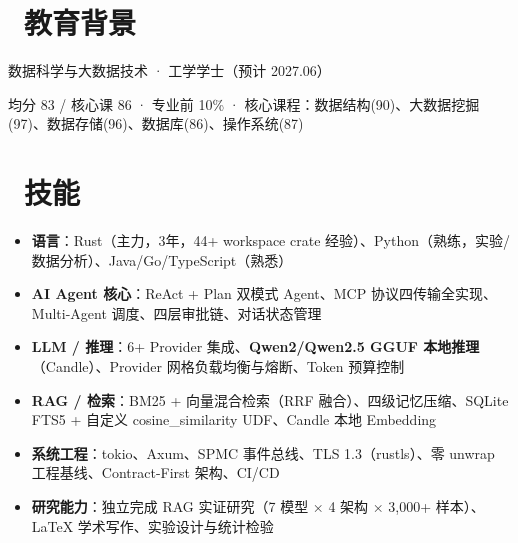 \documentclass{resume}
\begin{document}



\section{\faGraduationCap\ 教育背景}
数据科学与大数据技术 · 工学学士（预计 2027.06）

均分 83 / 核心课 86 · 专业前 10\% · 核心课程：数据结构(90)、大数据挖掘(97)、数据存储(96)、数据库(86)、操作系统(87)

\section{\faCogs\ 技能}
\begin{itemize}[parsep=0.5ex]
  \item \textbf{语言}：Rust（主力，3年，44+ workspace crate 经验）、Python（熟练，实验/数据分析）、Java/Go/TypeScript（熟悉）
  \item \textbf{AI Agent 核心}：ReAct + Plan 双模式 Agent、MCP 协议四传输全实现、Multi-Agent 调度、四层审批链、对话状态管理
  \item \textbf{LLM / 推理}：6+ Provider 集成、\textbf{Qwen2/Qwen2.5 GGUF 本地推理}（Candle）、Provider 网格负载均衡与熔断、Token 预算控制
  \item \textbf{RAG / 检索}：BM25 + 向量混合检索（RRF 融合）、四级记忆压缩、SQLite FTS5 + 自定义 cosine\_similarity UDF、Candle 本地 Embedding
  \item \textbf{系统工程}：tokio、Axum、SPMC 事件总线、TLS 1.3（rustls）、零 unwrap 工程基线、Contract-First 架构、CI/CD
  \item \textbf{研究能力}：独立完成 RAG 实证研究（7 模型 × 4 架构 × 3,000+ 样本）、LaTeX 学术写作、实验设计与统计检验
\end{itemize}
\end{document}
